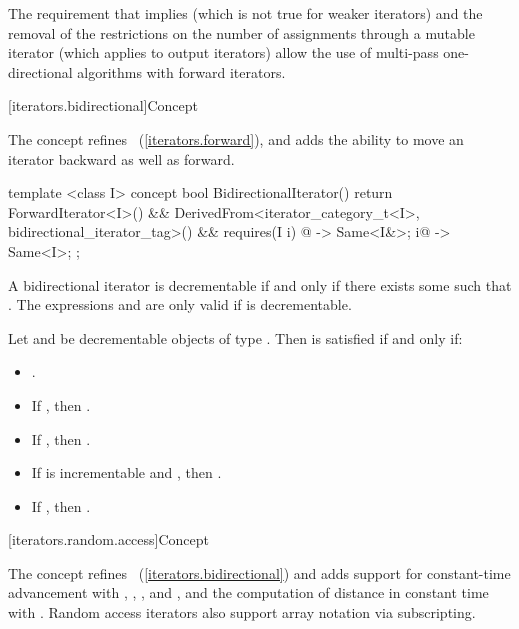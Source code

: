 \pnum
\enternote
The requirement that
implies
(which is not true for weaker iterators)
and the removal of the restrictions on the number of assignments through
a mutable iterator
(which applies to output iterators)
allow the use of multi-pass one-directional algorithms with forward iterators.
\exitnote

[iterators.bidirectional]{Concept }

\pnum
The  concept refines ~(\ref{iterators.forward}),
and adds the ability to move an iterator backward as well as forward.

%
\begin{codeblock}
  template <class I>
  concept bool BidirectionalIterator() {
    return ForwardIterator<I>() &&
      DerivedFrom<iterator_category_t<I>, bidirectional_iterator_tag>() &&
      requires(I i) {
        { @\dcr@i } -> Same<I&>;
        { i@\dcr@ } -> Same<I>;
      };
  }
\end{codeblock}

\pnum
A bidirectional iterator  is decrementable if and only if there exists some  such that
. The expressions  and  are only valid if  is
decrementable.

\pnum
Let  and  be decrementable objects of type . Then
 is satisfied if and only if:

\begin{itemize}
\item {}.
\item If , then .
\item If , then .
\item If  is incrementable and , then
      .
\item If , then .
\end{itemize}

[iterators.random.access]{Concept }

\pnum
The  concept refines ~(\ref{iterators.bidirectional})
and adds support for constant-time advancement with \tcode{+=}, \tcode{+},  \tcode{-=}, and \tcode{-}, and the
computation of distance in constant time with \tcode{-}. Random access iterators also support array
notation via subscripting.

